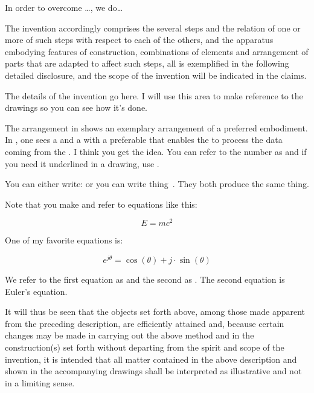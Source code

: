 \documentclass[english]{uspatent}
\begin{document}
\patentParagraph In order to overcome \ldots, we do\ldots

\patentParagraph The invention accordingly comprises the several steps and the relation of one or more of such steps with respect to each of the others, and the apparatus embodying features of construction, combinations of elements and arrangement of parts that are adapted to affect such steps, all is exemplified in the following detailed disclosure, and the scope of the invention will be indicated in the claims.

\patentDrawingDescriptions


\patentParagraph The details of the invention go here. I will use this area to make reference to the drawings so you can see how it's done.

\patentParagraph The arrangement in  shows an exemplary arrangement of a preferred embodiment. In , one sees a  and a  with a preferable  that enables the  to process the data coming from the . I think you get the idea.  You can refer to the number as  and if you need it underlined in a drawing, use .

\patentParagraph You can either write:  or you can write thing~. They both produce the same thing.

\patentParagraph Note that you make and refer to equations like this:

\begin{equation}
E=mc^{2}\label{eq:energy}
\end{equation}

\patentParagraph One of my favorite equations is:

\begin{equation}
e^{j\theta}=\cos\left(\theta\right)+j\cdot\sin\left(\theta\right)\label{eq:euler}
\end{equation}

\patentParagraph We refer to the first equation as  and the second as . The second equation  is Euler's equation.

\patentParagraph It will thus be seen that the objects set forth above, among those made apparent from the preceding description, are efficiently attained and, because certain changes may be made in carrying out the above method and in the construction(s) set forth without departing from the spirit and scope of the invention, it is intended that all matter contained in the above description and shown in the accompanying drawings shall be interpreted as illustrative and not in a limiting sense.
\end{document}

